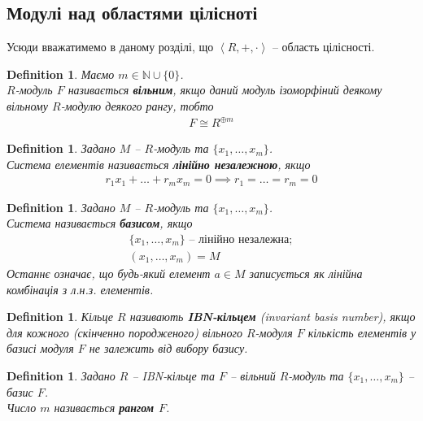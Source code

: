 \documentclass[a4paper, 10pt]{article}
\theoremstyle{theoremdd}
\theoremstyle{theoremdd}
\newtheorem{definition}[theorem]{Definition}
\theoremstyle{theoremdd}
\theoremstyle{theoremdd}
\theoremstyle{theoremdd}
\theoremstyle{theoremdd}
\theoremstyle{theoremdd}
\theoremstyle{theoremdd}
\theoremstyle{theoremdd}
\theoremstyle{theoremdd}
\theoremstyle{theoremdd}
\theoremstyle{theoremdd}
\theoremstyle{theoremdd}
\theoremstyle{theoremdd}
\theoremstyle{theoremdd}
\begin{document}
\subsection{Модулі над областями цілісноті}
Усюди вважатимемо в даному розділі, що $\left<R,+,\cdot \right>$ -- область цілісності.

\begin{definition}
Маємо $m \in \mathbb{N} \cup \{0\}$. \\
$R$-модуль $F$ називається \textbf{вільним}, якщо даний модуль ізоморфіний деякому вільному $R$-модулю деякого рангу, тобто
\begin{align*}
F \cong R^{\oplus m}
\end{align*}
\end{definition}

\begin{definition}
Задано $M$ -- $R$-модуль та $\{x_1,\dots,x_m\}$.\\
Система елементів називається \textbf{лінійно незалежною}, якщо
\begin{align*}
r_1 x_1 + \dots + r_m x_m = 0 \implies r_1 = \dots = r_m = 0
\end{align*}
\end{definition}

\begin{definition}
Задано $M$ -- $R$-модуль та $\{x_1,\dots,x_m\}$.\\
Система називається \textbf{базисом}, якщо
\begin{align*}
\{x_1,\dots,x_m\} \text{ -- лінійно незалежна}; \\
(x_1,\dots,x_m) = M
\end{align*}
Останнє означає, що будь-який елемент $a \in M$ записується як лінійна комбінація з л.н.з. елементів.
\end{definition}

\begin{definition}
Кільце $R$ називають \textbf{IBN-кільцем} (invariant basis number), якщо для кожного (скінченно породженого) вільного $R$-модуля $F$ кількість елементів у базисі модуля $F$ не залежить від вибору базису.
\end{definition}

\begin{definition}
Задано $R$ -- IBN-кільце та $F$ -- вільний $R$-модуль та $\{x_1,\dots,x_m\}$ -- базис $F$.\\
Число $m$ називається \textbf{рангом $F$}.
\end{definition}
\end{document}
